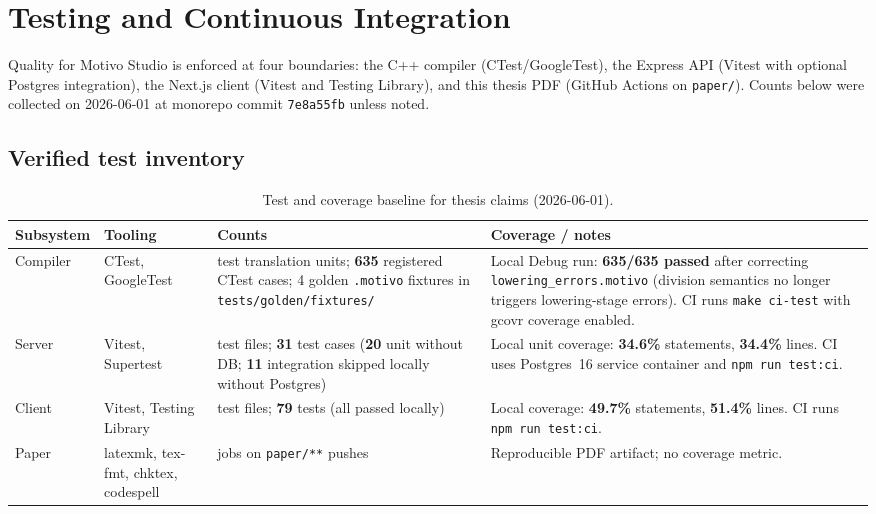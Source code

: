 \section{Testing and Continuous Integration}\label{sec:testing-ci}

Quality for Motivo Studio is enforced at four boundaries: the C++ compiler (CTest/GoogleTest), the Express API
(Vitest with optional Postgres integration), the Next.js client (Vitest and Testing Library), and this thesis PDF
(GitHub Actions on \texttt{paper/}).
Counts below were collected on 2026-06-01 at monorepo commit \texttt{7e8a55fb} unless noted.

\subsection{Verified test inventory}\label{subsec:test-inventory}

\begin{table}[htbp]
  \centering
  \renewcommand{\arraystretch}{1.3}
  \begin{tabularx}{\textwidth}{>{\raggedright\arraybackslash}p{2.5cm}>{\raggedright\arraybackslash}p{2.8cm}>{\raggedright\arraybackslash}p{2.4cm}X}
    \toprule
    \textbf{Subsystem} & \textbf{Tooling} & \textbf{Counts} & \textbf{Coverage / notes} \\
    \midrule
    Compiler & CTest, GoogleTest & 53 test translation units; \textbf{635} registered CTest cases; 4 golden
    \texttt{.motivo} fixtures in \texttt{tests/golden/fixtures/} & Local Debug run: \textbf{635/635 passed} after
    correcting \texttt{lowering\_errors.motivo} (division semantics no longer triggers lowering-stage errors).
    CI runs \texttt{make ci-test} with gcovr coverage enabled. \\
    Server & Vitest, Supertest & 7 test files; \textbf{31} test cases (\textbf{20} unit without DB; \textbf{11}
    integration skipped locally without Postgres) & Local unit coverage: \textbf{34.6\%} statements,
    \textbf{34.4\%} lines. CI uses Postgres~16 service container and \texttt{npm run test:ci}. \\
    Client & Vitest, Testing Library & 26 test files; \textbf{79} tests (all passed locally) & Local coverage:
    \textbf{49.7\%} statements, \textbf{51.4\%} lines. CI runs \texttt{npm run test:ci}. \\
    Paper & latexmk, tex-fmt, chktex, codespell & 4 jobs on \texttt{paper/**} pushes & Reproducible PDF artifact; no
    coverage metric. \\
    \bottomrule
  \end{tabularx}
  \caption{Test and coverage baseline for thesis claims (2026-06-01).}\label{tab:test-counts}
\end{table}

